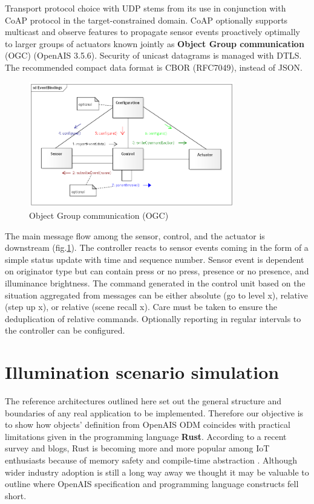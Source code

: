 \documentclass[11pt, english, a4paper, twoside]{article}
\begin{document}
Transport protocol choice with UDP stems from its use in conjunction with CoAP protocol in the target-constrained domain. CoAP optionally supports multicast and observe features to propagate sensor events proactively optimally to larger groups of actuators known jointly as \textbf{Object Group communication} (OGC) (OpenAIS 3.5.6).  Security of unicast datagrams is managed with DTLS. The recommended compact data format is CBOR (RFC7049), instead of JSON.

\begin{figure}[h]
	\centering
	\includegraphics[width=0.8\textwidth]{EventBindings.png}
	\caption{Object Group communication (OGC)}
	\label{fig:ogc}
\end{figure}

The main message flow among the sensor, control, and the actuator is downstream (fig.\ref{fig:ogc}). The controller reacts to sensor events coming in the form of a simple status update with time and sequence number. Sensor event is dependent on originator type but can contain press or no press, presence or no presence, and illuminance brightness. The command generated in the control unit based on the situation aggregated from messages can be either absolute (go to level x), relative (step up x), or relative (scene recall x). Care must be taken to ensure the deduplication of relative commands. Optionally reporting in regular intervals to the controller can be configured.

\section{Illumination scenario simulation} \label{demoapp}
The reference architectures outlined here set out the general structure and boundaries of any real application to be implemented. Therefore our objective is to show how objects' definition from OpenAIS ODM coincides with practical limitations given in the programming language \textbf{Rust}. According to a recent survey and blogs, Rust is becoming more and more popular among IoT enthusiasts because of memory safety and compile-time abstraction \cite{rust-iot} \cite{rust-adoption}. Although wider industry adoption is still a long way away we thought it may be valuable to outline where OpenAIS specification and programming language constructs fell short.
\end{document}
